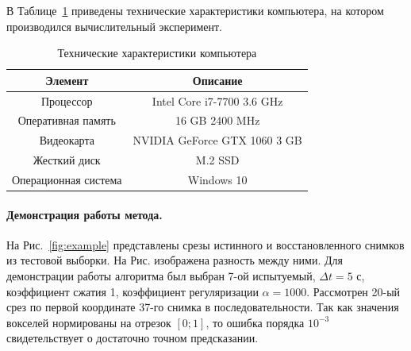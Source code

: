 В Таблице~\ref{table:pc} приведены технические характеристики компьютера, на котором
производился вычислительный эксперимент.

\begin{table}[h!]
	\centering
	\caption{Технические характеристики компьютера}
	\begin{tabular}{|c|c|}
		\hline
		Элемент & Описание \\
		\hline \hline
		Процессор & Intel Core i7-7700 3.6 GHz \\ \hline
		Оперативная память & 16 GB 2400 MHz \\ \hline
		Видеокарта & NVIDIA GeForce GTX 1060 3 GB \\ \hline
		Жесткий диск & M.2 SSD \\ \hline
		Операционная система & Windows 10 \\ \hline
	\end{tabular}
	\label{table:pc}
\end{table}

\paragraph*{Демонстрация работы метода.}

На Рис.~\ref{fig:example} представлены срезы истинного и восстановленного снимков из
тестовой выборки. На Рис. изображена разность между ними.
Для демонстрации работы алгоритма был выбран 7-ой испытуемый, $\Delta t = 5 \text{ с}$, коэффициент сжатия 1, коэффициент регуляризации
$\alpha = 1000$. Рассмотрен 20-ый срез по первой координате 37-го снимка в последовательности.
Так как значения вокселей нормированы на отрезок $[0; 1]$, то ошибка порядка $10^{-3}$
свидетельствует о достаточно точном предсказании.

